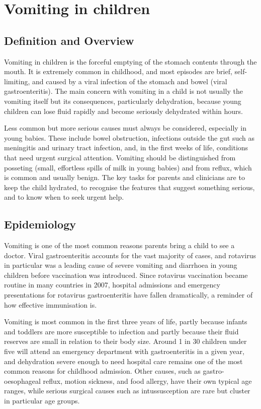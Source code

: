 \chapter{Vomiting in children}

\section*{Definition and Overview}
Vomiting in children is the forceful emptying of the stomach contents through the mouth. It is extremely common in childhood, and most episodes are brief, self-limiting, and caused by a viral infection of the stomach and bowel (viral gastroenteritis). The main concern with vomiting in a child is not usually the vomiting itself but its consequences, particularly dehydration, because young children can lose fluid rapidly and become seriously dehydrated within hours.

Less common but more serious causes must always be considered, especially in young babies. These include bowel obstruction, infections outside the gut such as meningitis and urinary tract infection, and, in the first weeks of life, conditions that need urgent surgical attention. Vomiting should be distinguished from posseting (small, effortless spills of milk in young babies) and from reflux, which is common and usually benign. The key tasks for parents and clinicians are to keep the child hydrated, to recognise the features that suggest something serious, and to know when to seek urgent help.

\section*{Epidemiology}
Vomiting is one of the most common reasons parents bring a child to see a doctor. Viral gastroenteritis accounts for the vast majority of cases, and rotavirus in particular was a leading cause of severe vomiting and diarrhoea in young children before vaccination was introduced. Since rotavirus vaccination became routine in many countries in 2007, hospital admissions and emergency presentations for rotavirus gastroenteritis have fallen dramatically, a reminder of how effective immunisation is.

Vomiting is most common in the first three years of life, partly because infants and toddlers are more susceptible to infection and partly because their fluid reserves are small in relation to their body size. Around 1 in 30 children under five will attend an emergency department with gastroenteritis in a given year, and dehydration severe enough to need hospital care remains one of the most common reasons for childhood admission. Other causes, such as gastro-oesophageal reflux, motion sickness, and food allergy, have their own typical age ranges, while serious surgical causes such as intussusception are rare but cluster in particular age groups.

